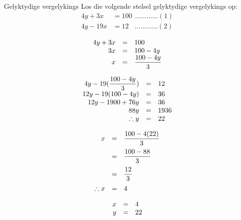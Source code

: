 \begin{wex}
{Gelyktydige vergelykings}
{
Los die volgende stelsel gelyktydige vergelykings op:
\begin{equation*}
\begin{array}{ccc}
  4y+3x &= 100  ~~\ldots \ldots \ldots \ldots (1) \\
  4y - 19x &= 12 ~~~~\ldots \ldots \ldots \ldots (2)
\end{array}
\end{equation*}
}
{
\begin{equation*}
    \begin{array}{ccl}\hfill 4y+3x & =& 100\hfill \\
\hfill 3x &=& 100 - 4y \hfill \\
\hfill x& =& \dfrac{100 - 4y}{3} \hfill
    \end{array}
\end{equation*}


\begin{equation*}
    \begin{array}{ccl}\hfill 4y - 19(\dfrac{100 - 4y}{3})& =& 12\hfill \\
	\hfill 12y - 19(100 - 4y)  & =& 36\hfill \\
	\hfill 12y - 1900 + 76y & =& 36 \hfill \\
\hfill  88y& =& 1936 \hfill \\
\hfill \therefore y& =& 22 \hfill
    \end{array}
\end{equation*}

\begin{equation*}
    \begin{array}{ccl}\hfill x &=& \dfrac{100 - 4(22)}{3}\hfill \vspace{6pt}\\
	\hfill & =& \dfrac{100-88}{3}\hfill \vspace{6pt}\\
	\hfill & =& \dfrac{12}{3}\hfill\vspace{6pt} \\
	\hfill \therefore x&=& 4 \hfill 
    \end{array}
\end{equation*}


\begin{equation*}
\begin{array}{ccc}
 \hfill x& =& 4\hfill \\
\hfill y& =& 22\hfill 
\end{array}
\end{equation*}
}
\end{wex}

